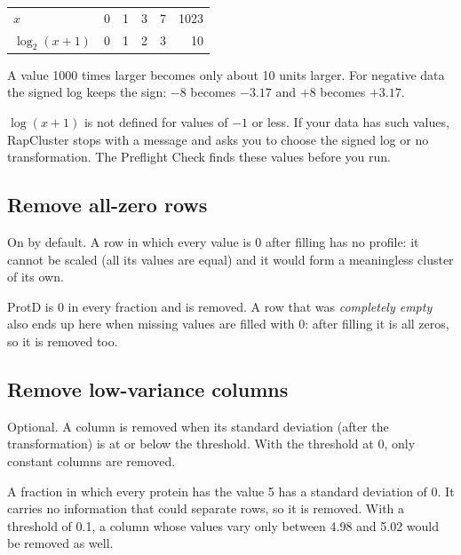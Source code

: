 \documentclass[11pt,a4paper]{article}
\begin{document}
\begin{example}
\begin{center}
\begin{tabular}{lrrrrr}
\toprule
$x$ & 0 & 1 & 3 & 7 & 1023\\
$\log_2(x+1)$ & 0 & 1 & 2 & 3 & 10\\
\bottomrule
\end{tabular}
\end{center}

A value 1000 times larger becomes only about 10 units larger. For negative data the signed log keeps the sign:
$-8$ becomes $-3.17$ and $+8$ becomes $+3.17$.
\end{example}

$\log(x+1)$ is not defined for values of $-1$ or less. If your data has such values, RapCluster stops with a
message and asks you to choose the signed log or no transformation. The Preflight Check finds these values before
you run.

\subsection{Remove all-zero rows}

On by default. A row in which every value is 0 after filling has no profile: it cannot be scaled (all its values are
equal) and it would form a meaningless cluster of its own.

\begin{example}
ProtD is 0 in every fraction and is removed. A row that was \emph{completely empty} also ends up here when missing
values are filled with 0: after filling it is all zeros, so it is removed too.
\end{example}

\subsection{Remove low-variance columns}

Optional. A column is removed when its standard deviation (after the transformation) is at or below the threshold.
With the threshold at 0, only constant columns are removed.

\begin{example}
A fraction in which every protein has the value 5 has a standard deviation of 0. It carries no information that
could separate rows, so it is removed. With a threshold of 0.1, a column whose values vary only between 4.98 and 5.02
would be removed as well.
\end{example}
\end{document}
